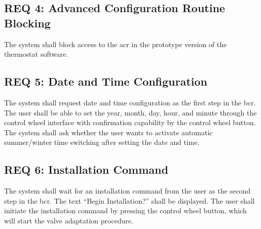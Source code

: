 \subsection*{REQ 4: Advanced Configuration Routine Blocking}
\label{subsec:REQ 4: Advanced Configuration Routine Blocking}
The system shall block access to the \acs{acr} in the prototype version of the thermostat software.

\subsection*{REQ 5: Date and Time Configuration}
\label{subsec:REQ 5: Date and Time Configuration}
The system shall request date and time configuration as the first step in the \acs{bcr}. The user shall be able to set the year, month, day, hour, and minute through the control wheel interface with confirmation capability by the control wheel button. The system shall ask whether the user wants to activate automatic summer/winter time switching after setting the date and time.

\subsection*{REQ 6: Installation Command}
\label{subsec:REQ 6: Installation Command}
The system shall wait for an installation command from the user as the second step in the \acs{bcr}. The text ``Begin Installation?'' shall be displayed. The user shall initiate the installation command by pressing the control wheel button, which will start the valve adaptation procedure.

